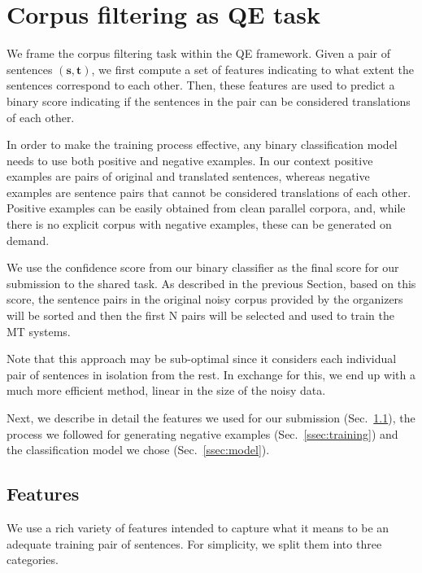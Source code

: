 \section{Corpus filtering as QE task}

We frame the corpus filtering task within the QE framework. Given a pair of sentences $(\mathbf{s}, \mathbf{t})$, we first compute a set of features indicating to what extent the sentences correspond to each other. Then, these features are used to predict a binary score indicating if the sentences in the pair can be considered translations of each other.

In order to make the training process effective, any binary classification model needs to use both positive and negative examples. In our context positive examples are pairs of original and translated sentences, whereas negative examples are sentence pairs that cannot be considered translations of each other. Positive examples can be easily obtained from clean parallel corpora, and, while there is no explicit corpus with negative examples, these can be generated on demand.

We use the confidence score from our binary classifier as the final score for our submission to the shared task. As described in the previous Section, based on this score, the sentence pairs in the original noisy corpus provided by the organizers will be sorted and then the first N pairs will be selected and used to train the MT systems.

Note that this approach may be sub-optimal since it considers each individual pair of sentences in isolation from the rest. In exchange for this, we end up with a much more efficient method, linear in the size of the noisy data.

Next, we describe in detail the features we used for our submission (Sec.~\ref{ssec:features}), the process we followed for generating negative examples (Sec.~\ref{ssec:training}) and the classification model we chose (Sec.~\ref{ssec:model}).

\subsection{Features}
\label{ssec:features}

We use a rich variety of features intended to capture what it means to be an adequate training pair of sentences. For simplicity, we split them into three categories.

